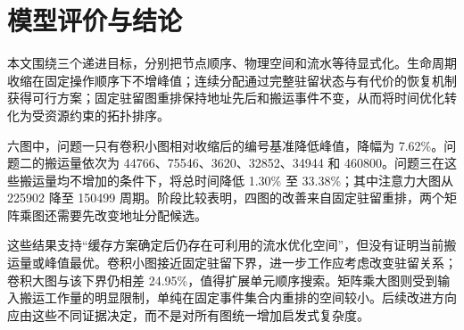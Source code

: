 \section{模型评价与结论}
本文围绕三个递进目标，分别把节点顺序、物理空间和流水等待显式化。生命周期收缩在固定操作顺序下不增峰值；连续分配通过完整驻留状态与有代价的恢复机制获得可行方案；固定驻留图重排保持地址先后和搬运事件不变，从而将时间优化转化为受资源约束的拓扑排序。

六图中，问题一只有卷积小图相对收缩后的编号基准降低峰值，降幅为 7.62\%。问题二的搬运量依次为 44766、75546、3620、32852、34944 和 460800。问题三在这些搬运量均不增加的条件下，将总时间降低 1.30\% 至 33.38\%；其中注意力大图从 225902 降至 150499 周期。阶段比较表明，四图的改善来自固定驻留重排，两个矩阵乘图还需要先改变地址分配候选。

这些结果支持“缓存方案确定后仍存在可利用的流水优化空间”，但没有证明当前搬运量或峰值最优。卷积小图接近固定驻留下界，进一步工作应考虑改变驻留关系；卷积大图与该下界仍相差 24.95\%，值得扩展单元顺序搜索。矩阵乘大图则受到输入搬运工作量的明显限制，单纯在固定事件集合内重排的空间较小。后续改进方向应由这些不同证据决定，而不是对所有图统一增加启发式复杂度。
